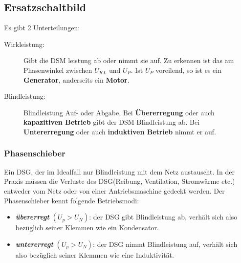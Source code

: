     \subsection{Ersatzschaltbild}
        \begin{minipage}{11cm}
            Es gibt 2 Unterteilungen:
            \begin{description}
                \item[Wirkleistung:] Gibt die DSM leistung ab oder nimmt sie auf. Zu erkennen ist das am Phasenwinkel
                zwischen $U_{KL}$ und $U_P$. Ist $U_P$ voreilend, so ist es ein \textbf{Generator}, anderseits ein
                \textbf{Motor}.
                \item[Blindleistung:] Blindleistung Auf- oder Abgabe. Bei \textbf{Übererregung} oder auch \textbf{kapazitiven
                Betrieb} gibt der DSM Blindleistung ab. Bei \textbf{Untererregung} oder auch \textbf{induktiven Betrieb}
                nimmt er auf.
            \end{description}
        \end{minipage}
        \begin{minipage}{8cm}
    	  	\subsubsection{Phasenschieber}
	      	Ein DSG, der im Idealfall nur Blindleistung mit dem Netz austauscht. In der Praxis müssen die Verluste des DSG(Reibung, Ventilation, Stromwärme etc.) entweder vom Netz oder von einer Antriebsmaschine gedeckt werden.
			Der Phasenschieber kennt folgende Betriebsmodi:
     		\begin{itemize}
     			\item \textbf{\emph{übererregt}} $(U_p > U_N)$: der DSG gibt Blindleistung ab, verhält sich also bezüglich seiner Klemmen wie ein Kondensator.
      			\item \textbf{\emph{untererregt}} $(U_p > U_N)$: der DSG nimmt Blindleistung auf, verhält sich also bezüglich seiner Klemmen wie eine Induktivität.
      		\end{itemize}
        \end{minipage}

